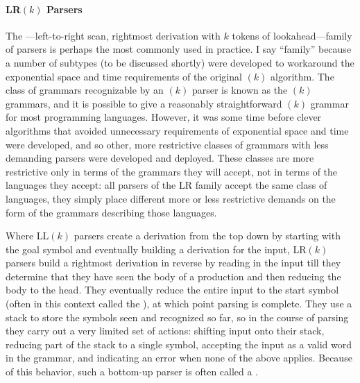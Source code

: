 \paragraph{LR$(k)$ Parsers}
The ---left-to-right scan, rightmost derivation with $k$ tokens of lookahead---family of parsers is perhaps the most commonly used in practice. I say ``family'' because a number of subtypes (to be discussed shortly) were developed to workaround the exponential space and time requirements of the original $(k)$ algorithm. The class of grammars recognizable by an $(k)$ parser is known as the $(k)$ grammars, and it is possible to give a reasonably straightforward $(k)$ grammar for most programming languages. However, it was some time before clever algorithms that avoided unnecessary requirements of exponential space and time were developed, and so other, more restrictive classes of grammars with less demanding parsers were developed and deployed. These classes are more restrictive only in terms of the grammars they will accept, not in terms of the languages they accept: all parsers of the LR family accept the same class of languages, they simply place different more or less restrictive demands on the form of the grammars describing those languages.

Where LL$(k)$ parsers create a derivation from the top down by starting with the goal symbol and eventually building a derivation for the input, LR$(k)$ parsers build a rightmost derivation in reverse by reading in the input till they determine that they have seen the body of a production and then reducing the body to the head. They eventually reduce the entire input to the start symbol (often in this context called the ), at which point parsing is complete. They use a stack to store the symbols seen and recognized so far, so in the course of parsing they carry out a very limited set of actions: shifting input onto their stack, reducing part of the stack to a single symbol, accepting the input as a valid word in the grammar, and indicating an error when none of the above applies. Because of this behavior, such a bottom-up parser is often called a .

